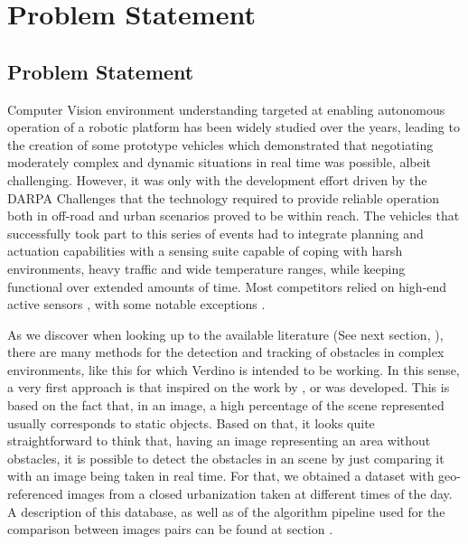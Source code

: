 
\chapter{Problem Statement}\label{ch:chapter01}

\section{Problem Statement}\label{ch:chapter01_01}

Computer Vision environment understanding targeted at enabling autonomous operation of a robotic platform has been widely studied over the years, leading to the creation of some prototype vehicles \cite{Maurer1996,Pomerleau1996,Broggi1999} which demonstrated that negotiating moderately complex and dynamic situations in real time was possible, albeit challenging. However, it was only with the development effort driven by the DARPA Challenges \cite{Buehler2007, Buehler2009} that the technology required to provide reliable operation both in off-road and urban scenarios proved to be within reach.
The vehicles that successfully took part to this series of events had to integrate planning and actuation capabilities with a sensing suite capable of coping with harsh environments, heavy traffic and wide temperature ranges, while keeping functional over extended amounts of time. Most competitors relied on high-end active sensors \cite{Urmson2008, Montemerlo2008, Bacha2008, Kammel2008}, with some notable exceptions \cite{Broggi2006, Broggi2010}. 

As we discover when looking up to the available literature (See next section, \todo{ \ref{XXX} }), there are many methods for the detection and tracking of obstacles in complex environments, like this for which Verdino is intended to be working. In this sense, a very first approach is that inspired on the work by \cite{primdahl2005change},  \cite{diego2011video} or \cite{vallespi2012prior} was developed. This is based on the fact that, in an image, a high percentage of the scene represented usually corresponds to static objects. Based on that, it looks quite straightforward to think that, having an image representing an area without obstacles, it is possible to detect the obstacles in an scene by just comparing it with an image being taken in real time. For that, we obtained a dataset with geo-referenced images from a closed urbanization taken at different times of the day. A description of this database, as well as of the algorithm pipeline used for the comparison between images pairs can be found at section \todo{ \ref{XXX} }.

